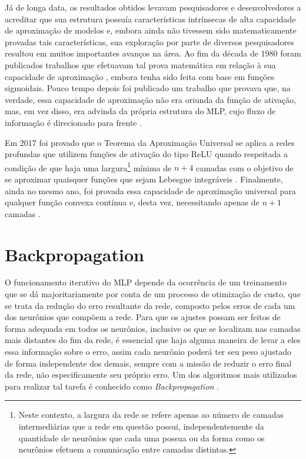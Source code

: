 Já de longa data, os resultados obtidos levavam pesquisadores e desenvolvedores a acreditar que sua estrutura possuía características intrínsecas de alta capacidade de aproximação de modelos e, embora ainda não tivessem sido matematicamente provadas tais características, sua exploração por parte de diversos pesquisadores resultou em muitos importantes avanços na área. Ao fim da década de 1980 foram publicados trabalhos que efetuavam tal prova matemática em relação à sua capacidade de aproximação \citep{cybenko1989approximation, hornik1989multilayer}, embora tenha sido feita com base em funções sigmoidais. Pouco tempo depois foi publicado um trabalho que provava que, na verdade, essa capacidade de aproximação não era oriunda da função de ativação, mas, em vez disso, era advinda da própria estrutura do MLP, cujo fluxo de informação é direcionado para frente \citep{HORNIK1991251}.

Em 2017 foi provado que o Teorema da Aproximação Universal se aplica a redes profundas que utilizem funções de ativação do tipo ReLU quando respeitada a condição de que haja uma largura\footnote{Neste contexto, a largura da rede se refere apenas ao número de camadas intermediárias que a rede em questão possui, independentemente da quantidade de neurônios que cada uma possua ou da forma como os neurônios efetuem a comunicação entre camadas distintas.} mínima de $n+4$ camadas com o objetivo de se aproximar quaisquer funções que sejam Lebesgue integráveis \citep{royden1988real}. Finalmente, ainda no mesmo ano, foi provada essa capacidade de aproximação universal para qualquer função convexa contínua e, desta vez, necessitando apenas de $n+1$ camadas \citep{hanin2017universal}.




\section{Backpropagation}
\label{sec:ann_backpropagation}

O funcionamento iterativo do MLP depende da ocorrência de um treinamento que se dá majoritariamente por conta de um processo de otimização de custo, que se trata da redução do erro resultante da rede, composto pelos erros de cada um dos neurônios que compõem a rede. Para que os ajustes possam ser feitos de forma adequada em todos os neurônios, inclusive os que se localizam nas camadas mais distantes do fim da rede, é essencial que haja alguma maneira de levar a eles essa informação sobre o erro, assim cada neurônio poderá ter seu peso ajustado de forma independente dos demais, sempre com a missão de reduzir o erro final da rede, não especificamente seu próprio erro. Um dos algoritmos mais utilizados para realizar tal tarefa é conhecido como \textit{Backpropagation} \citep{Rumelhart1986, rumelhart1988parallel}.

